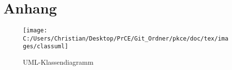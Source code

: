\chapter{Anhang}

\begin{figure}
	\centering
	\texttt{[image: C:/Users/Christian/Desktop/PrCE/Git\_Ordner/pkce/doc/tex/images/classuml]}
	\caption{UML-Klassendiagramm}
	\label{fig:classuml}
\end{figure}
